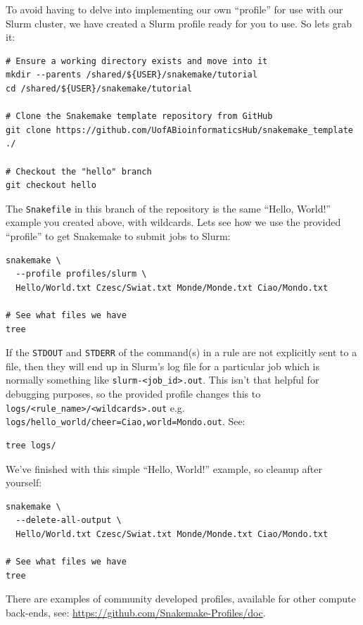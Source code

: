 To avoid having to delve into implementing our own ``profile'' for use with our Slurm cluster, we have created
a Slurm profile ready for you to use. So lets grab it:

\begin{lstlisting}
# Ensure a working directory exists and move into it
mkdir --parents /shared/${USER}/snakemake/tutorial
cd /shared/${USER}/snakemake/tutorial

# Clone the Snakemake template repository from GitHub
git clone https://github.com/UofABioinformaticsHub/snakemake_template ./

# Checkout the "hello" branch
git checkout hello
\end{lstlisting}

The \texttt{Snakefile} in this branch of the repository is the same ``Hello, World!'' example you created above,
with wildcards. Lets see how we use the provided ``profile'' to get Snakemake to submit jobs to Slurm:

\begin{lstlisting}
snakemake \
  --profile profiles/slurm \
  Hello/World.txt Czesc/Swiat.txt Monde/Monde.txt Ciao/Mondo.txt

# See what files we have
tree
\end{lstlisting}

If the \texttt{STDOUT} and \texttt{STDERR} of the command(s) in a rule are not explicitly sent to a file, then they will
end up in Slurm's log file for a particular job which is normally something like \texttt{slurm-<job\_id>.out}. This isn't
that helpful for debugging purposes, so the provided profile changes this to \texttt{logs/<rule\_name>/<wildcards>.out}
e.g. \texttt{logs/hello\_world/cheer=Ciao,world=Mondo.out}. See:

\begin{lstlisting}
tree logs/
\end{lstlisting}

We've finished with this simple ``Hello, World!'' example, so cleanup after yourself:

\begin{lstlisting}
snakemake \
  --delete-all-output \
  Hello/World.txt Czesc/Swiat.txt Monde/Monde.txt Ciao/Mondo.txt

# See what files we have
tree
\end{lstlisting}

\begin{warning}

There are examples of community developed profiles, available for other compute back-ends, see: \url{https://github.com/Snakemake-Profiles/doc}.

\end{warning}

